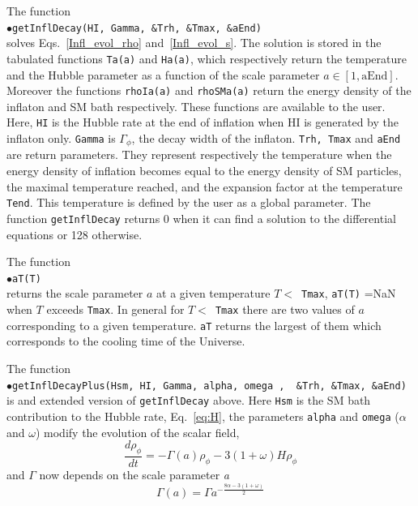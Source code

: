 \documentclass[12pt,a4paper]{article}
\begin{document}
\noindent
The function \\
$\bullet$\verb|getInflDecay(HI, Gamma, &Trh, &Tmax, &aEnd)|\\
solves Eqs.~\eqref{Infl_evol_rho} and~\eqref{Infl_evol_s}.  The solution is stored in the tabulated functions {\tt Ta(a)} and {\tt Ha(a)}, which respectively return 
the temperature and the Hubble parameter as a function of the scale parameter $a\in [1, \text{aEnd}]$.  Moreover the functions 
{\tt rhoIa(a)} and {\tt rhoSMa(a)} return the energy density of  the inflaton and SM bath respectively.
 These functions are available to the user. Here, \verb|HI| is the Hubble rate at the end of inflation when HI is generated by the inflaton only. \verb|Gamma| is $\Gamma_\phi$, the decay width of the inflaton. \verb|Trh, Tmax| and \verb|aEnd| are return parameters. They represent respectively the temperature when the energy density of inflation becomes equal to the energy density of SM particles, the maximal temperature reached, and the expansion factor at the temperature \verb|Tend|. This temperature is defined by the user as a global parameter.
 The function \verb|getInflDecay| returns 0 when it can find a solution to the differential equations or 128 otherwise.

   The function \\
$\bullet$\verb|aT(T)|\\
 returns the scale parameter $a$ at a given temperature $T<$~{\tt Tmax},  {\tt aT(T)} ={\rm NaN} when $T$ exceeds {\tt Tmax}. 
In general for  $T<$~{\tt Tmax}  there are two values of  $a$ corresponding  to a given temperature. {\tt aT} 
returns the largest of them  which corresponds to the cooling time  of the Universe.            


The function \\
$\bullet$\verb|getInflDecayPlus(Hsm, HI, Gamma, alpha, omega ,  &Trh, &Tmax, &aEnd)|\\
is and extended version of {\tt getInflDecay} above. Here {\tt Hsm} is the  SM bath contribution to the Hubble rate, Eq.~\ref{eq:H},
the parameters {\tt alpha} and {\tt omega}  ($\alpha$ and $\omega$) modify the evolution of the scalar field, 
\begin{equation}
 \label{eq:rhophi}
 \frac{d\rho_\phi}{dt}= -\Gamma(a) \rho_\phi -3(1+\omega)H\rho_\phi
\end{equation}
and  $\Gamma$ now depends on the scale parameter {\it a} 
\begin{equation}
  \label{eq:alphaw} 
  \Gamma(a) = \Gamma  a^{-\frac{ 8\alpha - 3(1+\omega)}{2}}
\end{equation}  
\end{document}
